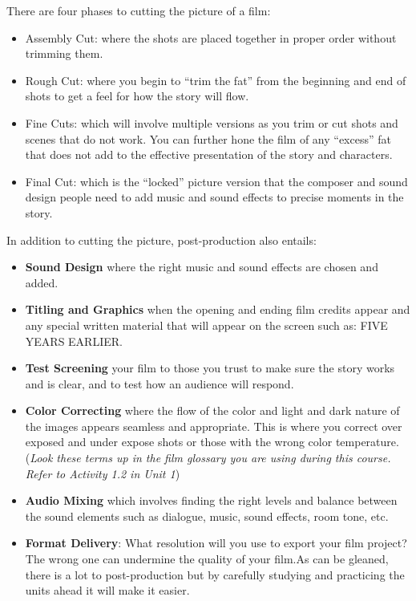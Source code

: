 \documentclass[
]{book}
\providecommand{\tightlist}{%
  \setlength{\itemsep}{0pt}\setlength{\parskip}{0pt}}
\begin{document}
There are four phases to cutting the picture of a film:

\begin{itemize}
\tightlist
\item
  Assembly Cut: where the shots are placed together in proper order without trimming them.\\
\item
  Rough Cut: where you begin to ``trim the fat'' from the beginning and end of shots to get a feel for how the story will flow.\\
\item
  Fine Cuts: which will involve multiple versions as you trim or cut shots and scenes that do not work. You can further hone the film of any ``excess'' fat that does not add to the effective presentation of the story and characters.\\
\item
  Final Cut: which is the ``locked'' picture version that the composer and sound design people need to add music and sound effects to precise moments in the story.
\end{itemize}

In addition to cutting the picture, post-production also entails:

\begin{itemize}
\item
  \textbf{Sound Design} where the right music and sound effects are chosen and added.
\item
  \textbf{Titling and Graphics} when the opening and ending film credits appear and any special written material that will appear on the screen such as: FIVE YEARS EARLIER.
\item
  \textbf{Test Screening} your film to those you trust to make sure the story works and is clear, and to test how an audience will respond.
\item
  \textbf{Color Correcting} where the flow of the color and light and dark nature of the images appears seamless and appropriate. This is where you correct over exposed and under expose shots or those with the wrong color temperature. (\emph{Look these terms up in the film glossary you are using during this course. Refer to Activity 1.2 in Unit 1})
\item
  \textbf{Audio Mixing} which involves finding the right levels and balance between the sound elements such as dialogue, music, sound effects, room tone, etc.
\item
  \textbf{Format Delivery}: What resolution will you use to export your film project? The wrong one can undermine the quality of your film.As can be gleaned, there is a lot to post-production but by carefully studying and practicing the units ahead it will make it easier.
\end{itemize}
\end{document}
